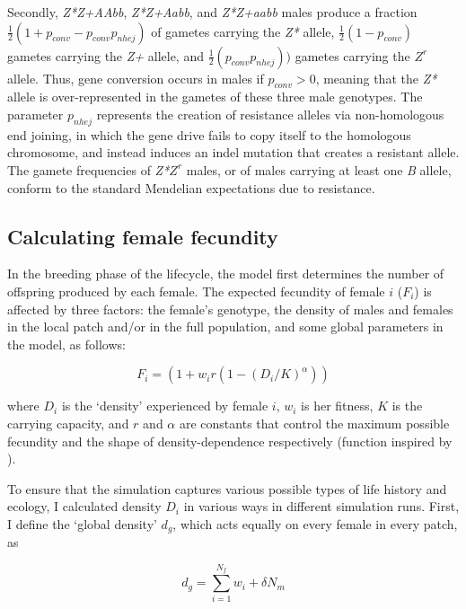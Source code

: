 \documentclass[]{rsos}%
\begin{document}
Secondly, \emph{Z*Z+AAbb}, \emph{Z*Z+Aabb}, and \emph{Z*Z+aabb} males
produce a fraction \(\frac{1}{2}(1 + p_{conv} - p_{conv} p_{nhej})\) of
gametes carrying the \emph{Z*} allele, \(\frac{1}{2}(1 - p_{conv})\)
gametes carrying the \emph{Z+} allele, and
\(\frac{1}{2}(p_{conv} p_{nhej}))\) gametes carrying the \(Z^r\) allele.
Thus, gene conversion occurs in males if \(p_{conv} > 0\), meaning that
the \emph{Z*} allele is over-represented in the gametes of these three
male genotypes. The parameter \(p_{nhej}\) represents the creation of
resistance alleles via non-homologous end joining, in which the gene
drive fails to copy itself to the homologous chromosome, and instead
induces an indel mutation that creates a resistant allele. The gamete
frequencies of \emph{Z*}\(Z^r\) males, or of males carrying at least one
\emph{B} allele, conform to the standard Mendelian expectations due to
resistance.

\hypertarget{calculating-female-fecundity}{%
\subsection{Calculating female
fecundity}\label{calculating-female-fecundity}}

In the breeding phase of the lifecycle, the model first determines the
number of offspring produced by each female. The expected fecundity of
female \(i\) (\(F_i\)) is affected by three factors: the female's
genotype, the density of males and females in the local patch and/or in
the full population, and some global parameters in the model, as
follows:

\[F_i = (1 + w_i r(1 - (D_i / K) ^ \alpha))\]

where \(D_i\) is the `density' experienced by female \(i\), \(w_i\) is
her fitness, \(K\) is the carrying capacity, and \(r\) and \(\alpha\)
are constants that control the maximum possible fecundity and the shape
of density-dependence respectively (function inspired by
\citep{fowler1981de}).

To ensure that the simulation captures various possible types of life
history and ecology, I calculated density \(D_i\) in various ways in
different simulation runs. First, I define the `global density' \(d_g\),
which acts equally on every female in every patch, as

\[d_g = \sum_{i=1}^{N_f} w_i + \delta N_m\]
\end{document}
